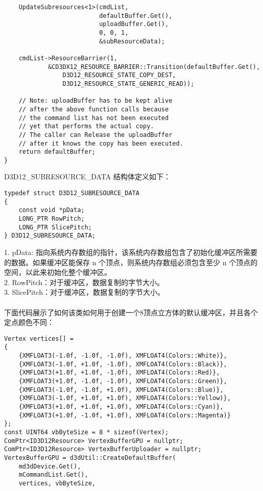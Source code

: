 \begin{flushleft}
\begin{lstlisting}
    UpdateSubresources<1>(cmdList, 
                          defaultBuffer.Get(), 
                          uploadBuffer.Get(),
                          0, 0, 1, 
                          &subResourceData);

    cmdList->ResourceBarrier(1, 
            &CD3DX12_RESOURCE_BARRIER::Transition(defaultBuffer.Get(),
                D3D12_RESOURCE_STATE_COPY_DEST, 
                D3D12_RESOURCE_STATE_GENERIC_READ));

    // Note: uploadBuffer has to be kept alive 
    // after the above function calls because
    // the command list has not been executed 
    // yet that performs the actual copy.
    // The caller can Release the uploadBuffer 
    // after it knows the copy has been executed.
    return defaultBuffer;
}
\end{lstlisting}
D3D12\_SUBRESOURCE\_DATA 结构体定义如下：\\
\begin{lstlisting}
typedef struct D3D12_SUBRESOURCE_DATA
{
    const void *pData;
    LONG_PTR RowPitch;
    LONG_PTR SlicePitch;
} D3D12_SUBRESOURCE_DATA;
\end{lstlisting}
1. pData: 指向系统内存数组的指针，该系统内存数组包含了初始化缓冲区所需要的数据。如果缓冲区能保存 n 个顶点，则系统内存数组必须包含至少 n 个顶点的空间，以此来初始化整个缓冲区。\\
2. RowPitch：对于缓冲区，数据复制的字节大小。\\
3. SlicePitch：对于缓冲区，数据复制的字节大小。\\
~\\
下面代码展示了如何该类如何用于创建一个8顶点立方体的默认缓冲区，并且各个定点颜色不同：\\
\begin{lstlisting}
Vertex vertices[] = 
{
    {XMFLOAT3(-1.0f, -1.0f, -1.0f), XMFLOAT4(Colors::White)},
    {XMFLOAT3(-1.0f, +1.0f, -1.0f), XMFLOAT4(Colors::Black)},
    {XMFLOAT3(+1.0f, +1.0f, -1.0f), XMFLOAT4(Colors::Red)},
    {XMFLOAT3(+1.0f, -1.0f, -1.0f), XMFLOAT4(Colors::Green)},
    {XMFLOAT3(-1.0f, -1.0f, +1.0f), XMFLOAT4(Colors::Blue)},
    {XMFLOAT3(-1.0f, +1.0f, +1.0f), XMFLOAT4(Colors::Yellow)},
    {XMFLOAT3(+1.0f, +1.0f, +1.0f), XMFLOAT4(Colors::Cyan)},
    {XMFLOAT3(+1.0f, -1.0f, +1.0f), XMFLOAT4(Colors::Magenta)}
};
const UINT64 vbByteSize = 8 * sizeof(Vertex);
ComPtr<ID3D12Resource> VertexBufferGPU = nullptr;
ComPtr<ID3D12Resource> VertexBufferUploader = nullptr;
VertexBufferGPU = d3dUtil::CreateDefaultBuffer(
    md3dDevice.Get(),
    mCommandList.Get(),
    vertices, vbByteSize,

\end{lstlisting}
\end{flushleft}
